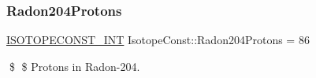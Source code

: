 \subsubsection{\texorpdfstring{Radon204\+Protons}{Radon204Protons}}
{\footnotesize\ttfamily \mbox{\hyperlink{group___isotope_const-_macros_ga5f18360b3e99483a35c32d789e62621c}{I\+S\+O\+T\+O\+P\+E\+C\+O\+N\+S\+T\+\_\+\+I\+NT}} Isotope\+Const\+::\+Radon204\+Protons = 86}

\$ \$ Protons in Radon-\/204. 